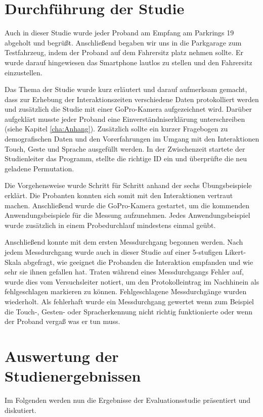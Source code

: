 \section[Durchführung der Studie]{Durchführung der Studie}
Auch in dieser Studie wurde jeder Proband am Empfang am Parkrings 19 abgeholt und begrüßt.
Anschließend begaben wir uns in die Parkgarage zum Testfahrzeug, indem der Proband auf dem Fahrersitz platz nehmen sollte.
Er wurde darauf hingewiesen das Smartphone lautlos zu stellen und den Fahrersitz einzustellen.

Das Thema der Studie wurde kurz erläutert und darauf aufmerksam gemacht, dass zur Erhebung der Interaktionszeiten verschiedene Daten protokolliert werden und zusätzlich die Studie mit einer GoPro-Kamera aufgezeichnet wird.
Darüber aufgeklärt musste jeder Proband eine Einverständniserklärung unterschreiben (siehe Kapitel \ref{cha:Anhang}).
Zusätzlich sollte ein kurzer Fragebogen zu demografischen Daten und den Vorerfahrungen im Umgang mit den Interaktionen Touch, Geste und Sprache ausgefüllt werden.
In der Zwischenzeit startete der Studienleiter das Programm, stellte die richtige ID ein und überprüfte die neu geladene Permutation.

Die Vorgehensweise wurde Schritt für Schritt anhand der sechs Übungsbeispiele erklärt.
Die Probanten konnten sich somit mit den Interaktionen vertraut machen. 
Anschließend wurde die GoPro-Kamera gestartet, um die kommenden Anwendungsbeispiele für die Messung aufzunehmen.
Jedes Anwendungsbeispiel wurde zusätzlich in einem Probedurchlauf mindestens einmal geübt. 

Anschließend konnte mit dem ersten Messdurchgang begonnen werden. 
Nach jedem Messdurchgang wurde auch in dieser Studie auf einer 5-stufigen Likert-Skala abgefragt, wie geeignet die Probanden die Interaktion empfanden und wie sehr sie ihnen gefallen hat.
Traten während eines Messdurchgangs Fehler auf, wurde dies vom Versuchsleiter notiert, um den Protokolleintrag im Nachhinein als fehlgeschlagen markieren zu können. 
Fehlgeschlagene Messdurchgänge wurden wiederholt. 
Als fehlerhaft wurde ein Messdurchgang gewertet wenn zum Beispiel die Touch-, Gesten- oder Spracherkennung nicht richtig funktionierte oder wenn der Proband vergaß was er tun muss. 
\clearpage

\section[Auswertung der Studienergebnissen]{Auswertung der Studienergebnissen}
Im Folgenden werden nun die Ergebnisse der Evaluationsstudie präsentiert und diskutiert. 

